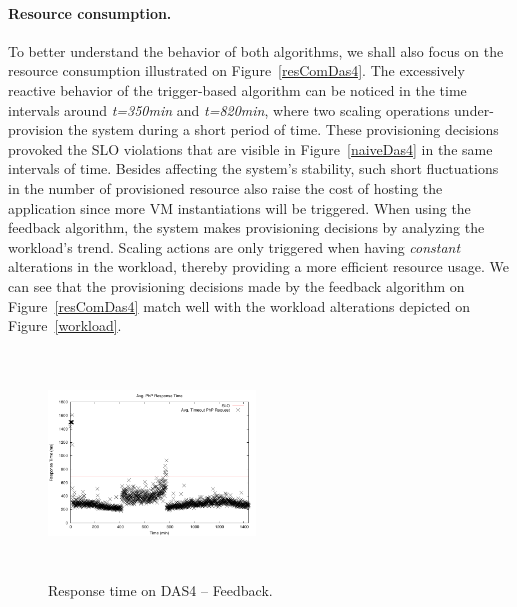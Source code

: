 \paragraph{Resource consumption.}

To better understand the behavior of both algorithms, we shall also focus on the resource consumption illustrated on Figure~\ref{resComDas4}. The excessively reactive behavior of the trigger-based algorithm can be noticed in the time intervals around \emph{t=350min} and \emph{t=820min}, where two scaling operations under-provision the system during a short period of time. These provisioning decisions provoked the SLO violations that are visible in Figure~\ref{naiveDas4} in the same intervals of time. Besides affecting the system's stability, such short fluctuations in the number of provisioned resource also raise the cost of hosting the application since more VM instantiations will be triggered. When using the feedback algorithm, the system makes provisioning decisions by analyzing the workload's trend. Scaling actions are only triggered when having \emph{constant} alterations in the workload, thereby providing a more efficient resource usage. We can see that the provisioning decisions made by the feedback algorithm on Figure~\ref{resComDas4} match well with the workload alterations depicted on Figure~\ref{workload}.

\begin{figure}
\begin{center}
\includegraphics[width=0.49\textwidth, height=6cm]{./images/homogeneous/avgTimeout_PhP_feedback}
\end{center}
\vspace{-5mm}
\caption{Response time on DAS4 -- Feedback.}
\label{historyDas4}
\end{figure}

